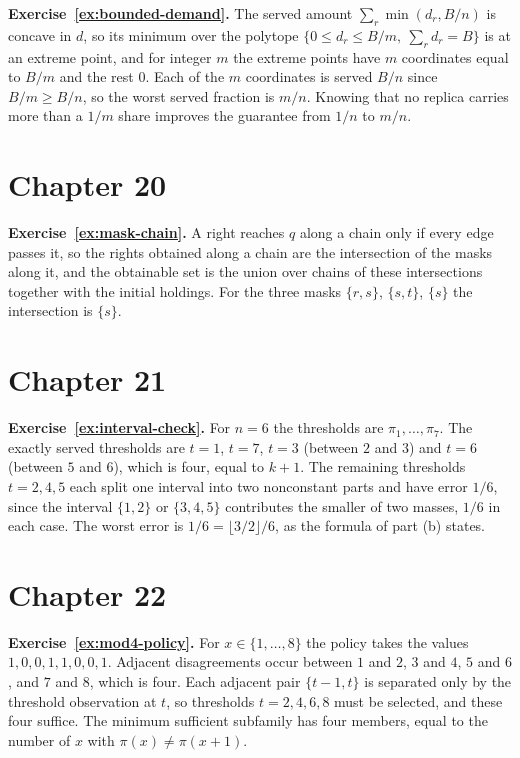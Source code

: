 \textbf{Exercise~\ref{ex:bounded-demand}.} The served amount $\sum_r\min(d_r,B/n)$ is concave in $d$, so its minimum over the polytope $\{0\le d_r\le B/m,\ \sum_r d_r=B\}$ is at an extreme point, and for integer $m$ the extreme points have $m$ coordinates equal to $B/m$ and the rest $0$. Each of the $m$ coordinates is served $B/n$ since $B/m\ge B/n$, so the worst served fraction is $m/n$. Knowing that no replica carries more than a $1/m$ share improves the guarantee from $1/n$ to $m/n$.

\section*{Chapter 20}

\textbf{Exercise~\ref{ex:mask-chain}.} A right reaches $q$ along a chain only if every edge passes it, so the rights obtained along a chain are the intersection of the masks along it, and the obtainable set is the union over chains of these intersections together with the initial holdings. For the three masks $\{r,s\}$, $\{s,t\}$, $\{s\}$ the intersection is $\{s\}$.

\section*{Chapter 21}

\textbf{Exercise~\ref{ex:interval-check}.} For $n=6$ the thresholds are $\pi_1,\dots,\pi_7$. The exactly served thresholds are $t=1$, $t=7$, $t=3$ (between $2$ and $3$) and $t=6$ (between $5$ and $6$), which is four, equal to $k+1$. The remaining thresholds $t=2,4,5$ each split one interval into two nonconstant parts and have error $1/6$, since the interval $\{1,2\}$ or $\{3,4,5\}$ contributes the smaller of two masses, $1/6$ in each case. The worst error is $1/6=\lfloor3/2\rfloor/6$, as the formula of part (b) states.

\section*{Chapter 22}

\textbf{Exercise~\ref{ex:mod4-policy}.} For $x\in\{1,\dots,8\}$ the policy takes the values $1,0,0,1,1,0,0,1$. Adjacent disagreements occur between $1$ and $2$, $3$ and $4$, $5$ and $6$, and $7$ and $8$, which is four. Each adjacent pair $\{t-1,t\}$ is separated only by the threshold observation at $t$, so thresholds $t=2,4,6,8$ must be selected, and these four suffice. The minimum sufficient subfamily has four members, equal to the number of $x$ with $\pi(x)\ne\pi(x+1)$.
